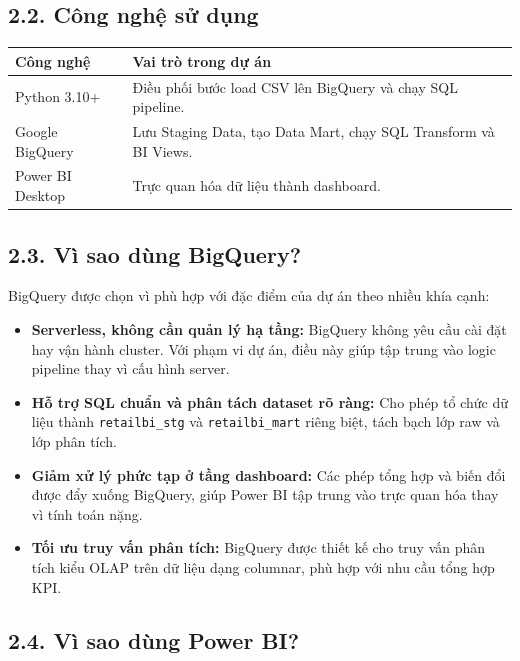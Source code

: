 \documentclass[12pt,a4paper]{article}
\newcommand{\code}[1]{\texttt{#1}}
\begin{document}
\subsection{2.2. Công nghệ sử dụng}

\begin{table}[H]
\centering
\begin{tabularx}{\textwidth}{|p{}|Y|}
\hline
\textbf{Công nghệ} & \textbf{Vai trò trong dự án} \\
\hline
Python 3.10+ & Điều phối bước load CSV lên BigQuery và chạy SQL pipeline. \\
\hline
Google BigQuery & Lưu Staging Data, tạo Data Mart, chạy SQL Transform và BI Views. \\
\hline
Power BI Desktop & Trực quan hóa dữ liệu thành dashboard. \\
\hline
\end{tabularx}
\end{table}

\subsection{2.3. Vì sao dùng BigQuery?}

BigQuery được chọn vì phù hợp với đặc điểm của dự án theo nhiều khía cạnh:

\begin{itemize}
    \item \textbf{Serverless, không cần quản lý hạ tầng:} BigQuery không yêu cầu cài đặt hay vận hành cluster. Với phạm vi dự án, điều này giúp tập trung vào logic pipeline thay vì cấu hình server.
    \item \textbf{Hỗ trợ SQL chuẩn và phân tách dataset rõ ràng:} Cho phép tổ chức dữ liệu thành \code{retailbi\_stg} và \code{retailbi\_mart} riêng biệt, tách bạch lớp raw và lớp phân tích.
    \item \textbf{Giảm xử lý phức tạp ở tầng dashboard:} Các phép tổng hợp và biến đổi được đẩy xuống BigQuery, giúp Power BI tập trung vào trực quan hóa thay vì tính toán nặng.
    \item \textbf{Tối ưu truy vấn phân tích:} BigQuery được thiết kế cho truy vấn phân tích kiểu OLAP trên dữ liệu dạng columnar, phù hợp với nhu cầu tổng hợp KPI.
\end{itemize}

\subsection{2.4. Vì sao dùng Power BI?}
\end{document}
